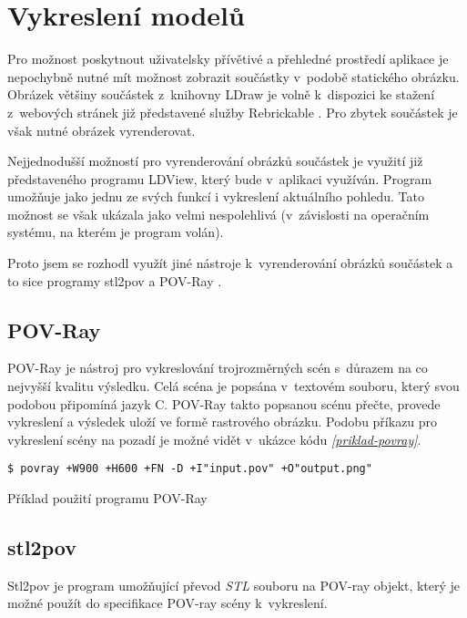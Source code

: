 \section{Vykreslení modelů}\label{reserse-vykresleni}
Pro možnost poskytnout uživatelsky přívětivé a přehledné prostředí aplikace je nepochybně nutné mít možnost zobrazit součástky v~podobě statického obrázku. Obrázek většiny součástek z~knihovny LDraw je volně k~dispozici ke stažení z~webových stránek již představené služby Rebrickable \autocite{rebrickable:download}. Pro zbytek součástek je však nutné obrázek vyrenderovat. 

Nejjednodušší možností pro vyrenderování obrázků součástek je využití již představeného programu LDView, který bude v~aplikaci využíván. Program umožňuje jako jednu ze svých funkcí i vykreslení aktuálního pohledu. Tato možnost se však ukázala jako velmi nespolehlivá (v~závislosti na operačním systému, na kterém je program volán).

Proto jsem se rozhodl využít jiné nástroje k~vyrenderování obrázků součástek a to sice programy stl2pov \autocite{stl2pov} a POV-Ray \autocite{povray}.

\subsection{POV-Ray}
POV-Ray je nástroj pro vykreslování trojrozměrných scén s~důrazem na co nejvyšší kvalitu výsledku. Celá scéna je popsána v~textovém souboru, který svou podobou připomíná jazyk C. POV-Ray takto popsanou scénu přečte, provede vykreslení a výsledek uloží ve formě rastrového obrázku. \autocite{root:povray} Podobu příkazu pro vykreslení scény na pozadí je možné vidět v~ukázce kódu \emph{\ref{priklad-povray}}. 

\begin{listing}[htbp]
        \begin{verbatim}
$ povray +W900 +H600 +FN -D +I"input.pov" +O"output.png" 
        \end{verbatim}
    \caption{Příklad použití programu POV-Ray \label{priklad-povray}}
\end{listing}

\subsection{stl2pov}
Stl2pov je program umožňující převod \textit{\gls{STL}} souboru na POV-ray objekt, který je možné použít do specifikace POV-ray scény k~vykreslení.  
